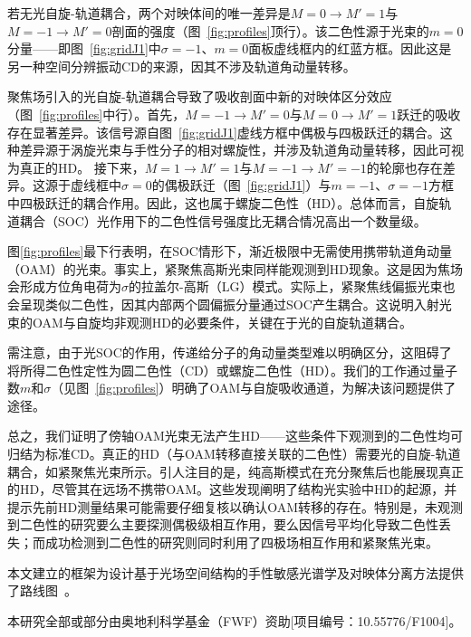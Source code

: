 \documentclass[reprint,aps,prl,twocolumn,superscriptaddress,groupedaddress]{revtex4-2}
\begin{document}
若无光自旋-轨道耦合，两个对映体间的唯一差异是$M=0\to M'=1$与$M=-1\to M'=0$剖面的强度（图~\ref{fig:profiles}顶行）。该二色性源于光束的$m=0$分量——即图~\ref{fig:gridJ1}中$\sigma=-1$、$m=0$面板虚线框内的红蓝方框。因此这是另一种空间分辨振动CD的来源，因其不涉及轨道角动量转移。

聚焦场引入的光自旋-轨道耦合导致了吸收剖面中新的对映体区分效应（图~\ref{fig:profiles}中行）。首先，$M=-1\to M'=0$与$M=0\to M'=1$跃迁的吸收存在显著差异。该信号源自图~\ref{fig:gridJ1}虚线方框中偶极与四极跃迁的耦合。这种差异源于涡旋光束与手性分子的相对螺旋性，并涉及轨道角动量转移，因此可视为真正的HD。
接下来，$M=1\to M'=1$与$M=-1\to M'=-1$的轮廓也存在差异。这源于虚线框中$\sigma=0$的偶极跃迁（图~\ref{fig:gridJ1}）与$m=-1$、$\sigma=-1$方框中四极跃迁的耦合作用。因此，这也属于螺旋二色性（HD）。总体而言，自旋轨道耦合（SOC）光作用下的二色性信号强度比无耦合情况高出一个数量级。

图\ref{fig:profiles}最下行表明，在SOC情形下，渐近极限中无需使用携带轨道角动量（OAM）的光束。事实上，紧聚焦高斯光束同样能观测到HD现象。这是因为焦场会形成方位角电荷为$\sigma$的拉盖尔-高斯（LG）模式。实际上，紧聚焦线偏振光束也会呈现类似二色性，因其内部两个圆偏振分量通过SOC产生耦合。这说明入射光束的OAM与自旋均非观测HD的必要条件，关键在于光的自旋轨道耦合。

需注意，由于光SOC的作用，传递给分子的角动量类型难以明确区分，这阻碍了将所得二色性定性为圆二色性（CD）或螺旋二色性（HD）。我们的工作通过量子数$m$和$\sigma$（见图~\ref{fig:profiles}）明确了OAM与自旋吸收通道，为解决该问题提供了途径。

总之，我们证明了傍轴OAM光束无法产生HD——这些条件下观测到的二色性均可归结为标准CD。真正的HD（与OAM转移直接关联的二色性）需要光的自旋-轨道耦合，如紧聚焦光束所示。引人注目的是，纯高斯模式在充分聚焦后也能展现真正的HD，尽管其在远场不携带OAM。这些发现阐明了结构光实验中HD的起源，并提示先前HD测量结果可能需要仔细复核以确认OAM转移的存在。特别是，未观测到二色性的研究要么主要探测偶极级相互作用\cite{Araoka2005}，要么因信号平均化导致二色性丢失\cite{Loeffler2011}；而成功检测到二色性的研究则同时利用了四极场相互作用和紧聚焦光束\cite{Rusak2019,Rouxel2022,Begin2023,Jain2023}。

本文建立的框架为设计基于光场空间结构的手性敏感光谱学及对映体分离方法提供了路线图~\cite{Leibscher2022}。\\
\begin{acknowledgments}
本研究全部或部分由奥地利科学基金（FWF）资助[项目编号：10.55776/F1004]。
\end{acknowledgments}

\end{document}
